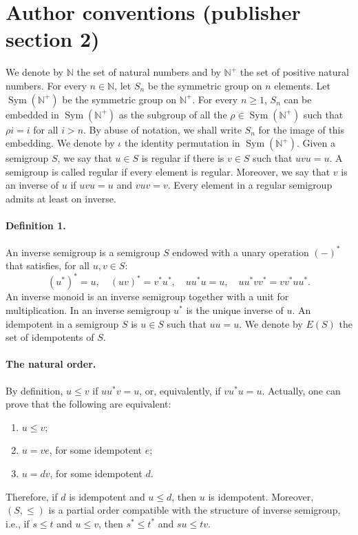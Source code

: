 \section*{Author conventions (publisher section 2)}
We denote by $\mathbb N$ the set of natural numbers and by $\mathbb N^+$ the set of positive natural numbers.
For every $n\in\mathbb N$, let $S_n$ be the symmetric group on $n$ elements. Let $\operatorname{Sym}(\mathbb N^+)$ be the symmetric group on $\mathbb N^+$.
For every $n\ge1$, $S_n$ can be embedded in $\operatorname{Sym}(\mathbb N^+)$ as the subgroup of all the $\rho\in\operatorname{Sym}(\mathbb N^+)$ such that $\rho i=i$ for all $i>n$. By abuse of notation, we shall write $S_n$ for the image of this embedding. We denote by $\iota$ the identity permutation in $\operatorname{Sym}(\mathbb N^+)$.
Given a semigroup $S$, we say that $u\in S$ is regular if there is $v\in S$ such that $uvu=u$. A semigroup is called regular if every element is regular.
Moreover, we say that $v$ is an inverse of $u$ if $uvu=u$ and $vuv=v$. Every element in a regular semigroup admits at least on inverse.
\paragraph{Definition 1.} An inverse semigroup is a semigroup $S$ endowed with a unary operation $(-)^*$ that satisfies, for all $u,v\in S$:
\[
(u^*)^*=u,\quad(uv)^*=v^*u^*,\quad uu^*u=u,\quad uu^*vv^*=vv^*uu^*.
\]
An inverse monoid is an inverse semigroup together with a unit for multiplication.
In an inverse semigroup $u^*$ is the unique inverse of $u$.
An idempotent in a semigroup $S$ is $u\in S$ such that $uu=u$. We denote by $E(S)$ the set of idempotents of $S$.
\paragraph{The natural order.} By definition, $u\le v$ if $uu^*v=u$, or, equivalently, if $vu^*u=u$. Actually, one can prove that the following are equivalent:
\begin{enumerate}
\item $u\le v$;
\item $u=ve$, for some idempotent $e$;
\item $u=dv$, for some idempotent $d$.
\end{enumerate}
Therefore, if $d$ is idempotent and $u\le d$, then $u$ is idempotent. Moreover, $(S,\le)$ is a partial order compatible with the structure of inverse semigroup, i.e., if $s\le t$ and $u\le v$, then $s^*\le t^*$ and $su\le tv$.
